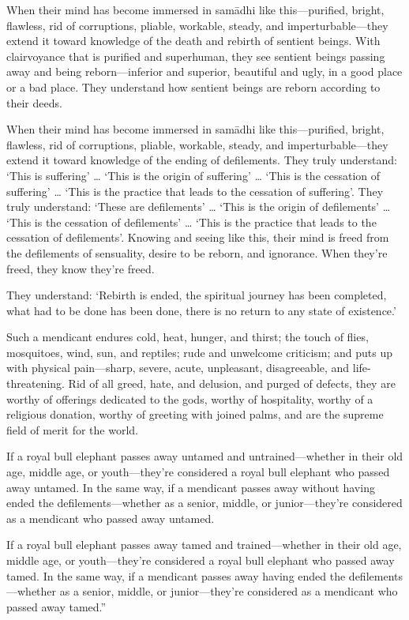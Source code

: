 \documentclass[12pt,openany]{book}%
\begin{document}
When their mind has become immersed in \textsanskrit{samādhi} like this—purified, bright, flawless, rid of corruptions, pliable, workable, steady, and imperturbable—they extend it toward knowledge of the death and rebirth of sentient beings. With clairvoyance that is purified and superhuman, they see sentient beings passing away and being reborn—inferior and superior, beautiful and ugly, in a good place or a bad place. They understand how sentient beings are reborn according to their deeds. 

When their mind has become immersed in \textsanskrit{samādhi} like this—purified, bright, flawless, rid of corruptions, pliable, workable, steady, and imperturbable—they extend it toward knowledge of the ending of defilements. They truly understand: ‘This is suffering’ … ‘This is the origin of suffering’ … ‘This is the cessation of suffering’ … ‘This is the practice that leads to the cessation of suffering’. They truly understand: ‘These are defilements’ … ‘This is the origin of defilements’ … ‘This is the cessation of defilements’ … ‘This is the practice that leads to the cessation of defilements’. Knowing and seeing like this, their mind is freed from the defilements of sensuality, desire to be reborn, and ignorance. When they’re freed, they know they’re freed. 

They understand: ‘Rebirth is ended, the spiritual journey has been completed, what had to be done has been done, there is no return to any state of existence.’ 

Such a mendicant endures cold, heat, hunger, and thirst; the touch of flies, mosquitoes, wind, sun, and reptiles; rude and unwelcome criticism; and puts up with physical pain—sharp, severe, acute, unpleasant, disagreeable, and life-threatening. Rid of all greed, hate, and delusion, and purged of defects, they are worthy of offerings dedicated to the gods, worthy of hospitality, worthy of a religious donation, worthy of greeting with joined palms, and are the supreme field of merit for the world. 

If a royal bull elephant passes away untamed and untrained—whether in their old age, middle age, or youth—they’re considered a royal bull elephant who passed away untamed. In the same way, if a mendicant passes away without having ended the defilements—whether as a senior, middle, or junior—they’re considered as a mendicant who passed away untamed. 

If a royal bull elephant passes away tamed and trained—whether in their old age, middle age, or youth—they’re considered a royal bull elephant who passed away tamed. In the same way, if a mendicant passes away having ended the defilements—whether as a senior, middle, or junior—they’re considered as a mendicant who passed away tamed.” 
\end{document}
